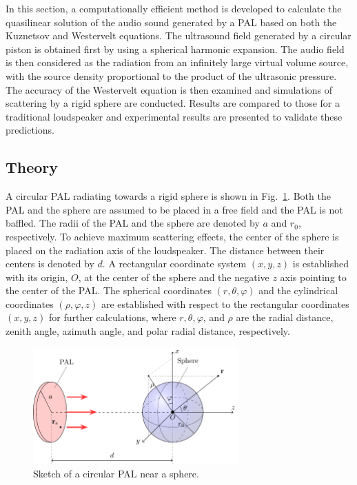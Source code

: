 In this section, a computationally efficient method is developed to calculate the quasilinear solution of the audio sound generated by a PAL based on both the Kuznetsov and Westervelt equations. The ultrasound field generated by a circular piston is obtained first by using a spherical harmonic expansion. The audio field is then considered as the radiation from an infinitely large virtual volume source, with the source density proportional to the product of the ultrasonic pressure. The accuracy of the Westervelt equation is then examined and simulations of scattering by a rigid sphere are conducted. Results are compared to those for a traditional loudspeaker and experimental results are presented to validate these predictions.

\subsection{Theory}
A circular PAL radiating towards a rigid sphere is shown in Fig.~\ref{fig:scat_sketch}. 
Both the PAL and the sphere are assumed to be placed in a free field and the PAL is not baffled. 
The radii of the PAL and the sphere are denoted by $a$ and $r_0$, respectively. 
To achieve maximum scattering effects, the center of the sphere is placed on the radiation axis of the loudspeaker. 
The distance between their centers is denoted by $d$. 
A rectangular coordinate system $(x, y, z)$ is established with its origin, $O$, at the center of the sphere and the negative $z$ axis pointing to the center of the PAL. 
The spherical coordinates $(r, \theta, \varphi)$ and the cylindrical coordinates $(\rho, \varphi, z)$ are established with respect to the rectangular coordinates $(x, y, z)$ for further calculations, where $r, \theta, \varphi$, and $\rho$ are the radial distance, zenith angle, azimuth angle, and polar radial distance, respectively.

\begin{figure}[!htb]
    \centering
    \includegraphics[width = 0.7\textwidth]{Figures/TheoryModel}
    \caption{Sketch of a circular PAL near a sphere.}
    \label{fig:scat_sketch}
\end{figure}
